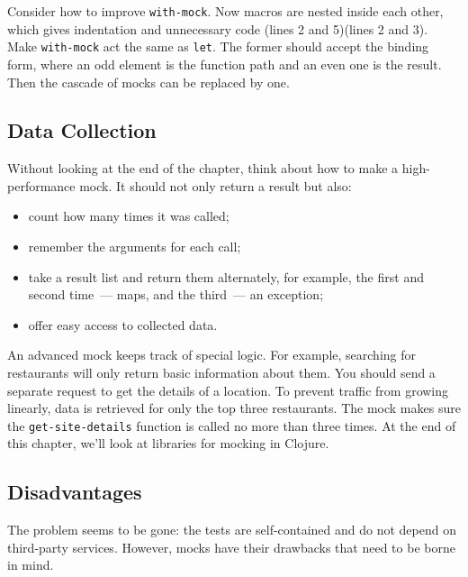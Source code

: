 Consider how to improve \verb|with-mock|. Now macros are nested inside each other, which gives indentation and unnecessary code \ifx\DEVICETYPE\MOBILE(lines 2 and 5)\else(lines 2 and 3)\fi. Make \verb|with-mock| act the same as \verb|let|. The former should accept the binding form, where an odd element is the function path and an even one is the result. Then the cascade of mocks can be replaced by one.

\subsection{Data Collection}


Without looking at the end of the chapter, think about how to make a high-performance mock. It should not only return a result but also:

\begin{itemize}

\item
  count how many times it was called;

\item
  remember the arguments for each call;

\item
  take a result list and return them alternately, for example, the first and second time~--- maps, and the third~--- an exception;

\item
  offer easy access to collected data.

\end{itemize}

An advanced mock keeps track of special logic. For example, searching for restaurants will only return basic information about them. You should send a separate request to get the details of a location. To prevent traffic from growing linearly, data is retrieved for only the top three restaurants. The mock makes sure the \verb|get-site-details| function is called no more than three times. At the end of this chapter, we'll look at libraries for mocking in Clojure.

\subsection{Disadvantages}

The problem seems to be gone: the tests are self-contained and do not depend on third-party services. However, mocks have their drawbacks that need to be borne in mind.

